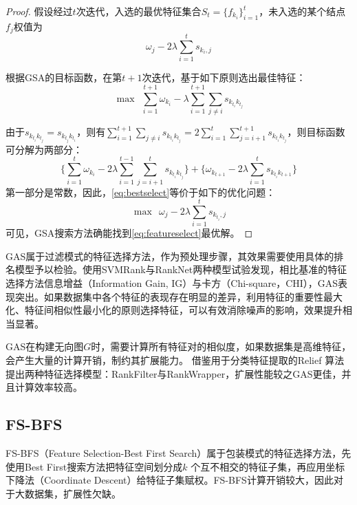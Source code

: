 \begin{proof}
假设经过$t$次迭代，入选的最优特征集合$S_t = \{f_{k_i}\}_{i=1}^t$，未入选的某个结点$f_j$权值为
\begin{equation}\label{eq:weightupdate}
  \omega_j - 2\lambda \sum\limits_{i=1}^t s_{{k_i},j}
\end{equation}

根据GSA的目标函数，在第$t+1$次迭代，基于如下原则选出最佳特征：
\begin{equation}\label{eq:bestselect}
    \max~~\sum\limits_{i=1}^{t+1} \omega_{k_i} - \lambda \sum\limits_{i=1}^{t+1}\sum\limits_{j\ne i} s_{k_{t_i}k_{t_j}}
\end{equation}

由于$s_{k_{t_i}k_{t_j}} = s_{k_{t_j}k_{t_i}}$，则有$\sum\limits_{i=1}^{t+1}\sum\limits_{j\ne i} s_{k_{t_i}k_{t_j}} = 2\sum\limits_{i=1}^{t}\sum\limits_{j = i+1}^{t+1} s_{k_{t_i}k_{t_j}}$，则目标函数可分解为两部分：
\begin{equation}
  \bigg\{\sum\limits_{i=1}^t \omega_{k_i} - 2\lambda \sum\limits_{i=1}^{t-1}\sum\limits_{j = i+1}^t s_{k_{t_i}k_{t_j}}\bigg\} + \bigg\{\omega_{k_{t+1}} - 2\lambda \sum\limits_{i=1}^t s_{k_{t_i}k_{t+1}}\bigg\}
\end{equation}
第一部分是常数，因此，\eqref{eq:bestselect}等价于如下的优化问题：
\begin{equation}\label{eq:lastselect}
    \max~~\omega_j - 2\lambda \sum\limits_{i=1}^t s_{k_{t_i},j}
\end{equation}
可见，GSA搜索方法确能找到\eqref{eq:featureselect}最优解。\qedhere
\end{proof}

GAS属于过滤模式的特征选择方法，作为预处理步骤，其效果需要使用具体的排名模型予以检验。\cite{geng2007feature}使用SVMRank与RankNet两种模型试验发现，相比基准的特征选择方法信息增益（Information Gain, IG）与卡方（Chi-square，CHI），GAS表现突出。如果数据集中各个特征的表现存在明显的差异，利用特征的重要性最大化、特征间相似性最小化的原则选择特征，可以有效消除噪声的影响，效果提升相当显著。

GAS在构建无向图$G$时，需要计算所有特征对的相似度，如果数据集是高维特征，会产生大量的计算开销，制约其扩展能力。\cite{yu2009efficient} 借鉴用于分类特征提取的Relief 算法\cite{kira1992practical}提出两种特征选择模型：RankFilter与RankWrapper，扩展性能较之GAS更佳，并且计算效率较高。

\subsection{FS-BFS}
FS-BFS（Feature Selection-Best First Search）属于包装模式的特征选择方法\cite{dang2010feature}，先使用Best First搜索方法把特征空间划分成$k$ 个互不相交的特征子集，再应用坐标下降法（Coordinate Descent）给特征子集赋权。FS-BFS计算开销较大，因此对于大数据集，扩展性欠缺。

